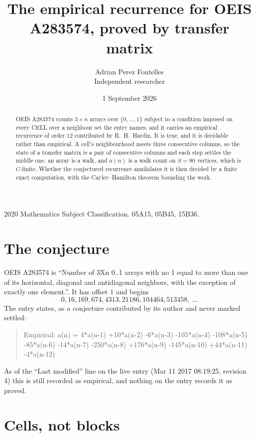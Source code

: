 \documentclass[11pt,a4paper]{article}
\title{The empirical recurrence for OEIS A283574, proved by transfer matrix}
\author{Adrian Perez Fontelles\\ \small Independent researcher}
\date{1 September 2026}
\theoremstyle{plain}
\theoremstyle{definition}
\begin{document}
\maketitle

\begin{abstract}
OEIS A283574 counts $3\times n$ arrays over $\{0,\dots,1\}$ subject to a condition imposed on
every CELL over a neighbour set the entry names, and it carries an empirical recurrence of
order $12$ contributed by R.~H.~Hardin. It is true, and it is decidable rather than
empirical. A cell's neighbourhood meets three consecutive columns, so the state of a transfer
matrix is a pair of consecutive columns and each step settles the middle one; an array is a
walk, and $a(n)$ is a walk count on $S=90$ vertices, which is $C$-finite. Whether the
conjectured recurrence annihilates it is then decided by a finite exact computation, with the
Cayley--Hamilton theorem bounding the work.
\end{abstract}

\noindent\small 2020 Mathematics Subject Classification. 05A15, 05B45, 15B36.\normalsize

\section{The conjecture}

OEIS A283574 is ``Number of 3Xn 0..1 arrays with no 1 equal to more than one of its horizontal, diagonal and antidiagonal neighbors, with the exception of exactly one element.''. It has offset $1$ and begins
\[
0, 16, 169, 674, 4313, 21186, 104464, 513458,\ \dots
\]
The entry states, as a conjecture contributed by its author and never marked settled:
\begin{quote}
Empirical: a(n) = 4*a(n-1) +10*a(n-2) -6*a(n-3) -105*a(n-4) -108*a(n-5) -85*a(n-6) -14*a(n-7) -250*a(n-8) +176*a(n-9) -145*a(n-10) +44*a(n-11) -4*a(n-12)
\end{quote}
As of the ``Last modified'' line on the live entry (Mar 11 2017 08:19:25, revision 4) this is still
recorded as empirical, and nothing on the entry records it as proved.

\section{Cells, not blocks}
\end{document}
